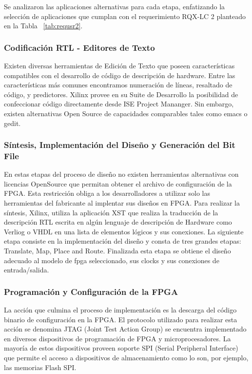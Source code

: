 				Se analizaron las aplicaciones alternativas para cada etapa, enfatizando la selección de aplicaciones que cumplan con el requerimiento RQX-LC 2
				planteado en la Tabla ~\ref{tab:requsr2}.   
				
				\subsubsection {Codificación RTL - Editores de Texto}
				Existen diversas herramientas de Edición de Texto que poseen características compatibles con el desarrollo de código de descripción de hardware.
				Entre las características más comunes encontramos numeración de líneas, resaltado de código, y predictores. 
				Xilinx provee en su Suite de Desarrollo la posibilidad de confeccionar código directamente desde ISE Project Mananger. Sin embargo,
				existen alternativas Open Source de capacidades comparables tales como emacs o gedit. 
				
				\subsubsection {Síntesis, Implementación del Diseño y Generación del Bit File}
				En estas etapas del proceso de diseño no existen herramientas alternativas con licencias OpenSource que permitan obtener el archivo de
				configuración de la FPGA. Esta restricción obliga a los desarrolladores a utilizar solo las herramientas del fabricante al implentar sus diseños
				en FPGA.
				Para realizar la síntesis, Xilinx, utiliza la aplicación XST que realiza la traducción de la descripción RTL escrita en algún lenguaje de
				descripción de Hardware como Verliog o VHDL en una lista de elementos lógicos y sus conexiones. La siguiente etapa consiste en la implementación 
				del diseño y consta de tres grandes etapas: Translate, Map, Place and Route. Finalizada esta etapa se obtiene el diseño adecuado al modelo de
				fpga seleccionado, sus clocks y sus conexiones de entrada/salida. 
				
				\subsubsection {Programación y Configuración de la FPGA}
				La acción que culmina el proceso de implementación es la descarga del código binario de configuración en la FPGA. El protocolo utilizado para
				realizar esta acción se denomina JTAG (Joint Test Action Group) se encuentra implementado en diversos dispositivos de programación de FPGA y
				microprocesadores. La mayoría de estos dispositivos proveen soporte SPI (Serial Peripheral Interface) que permite el acceso a dispositivos de
				almacenamiento como lo son, por ejemplo, las memorias Flash SPI.
				
